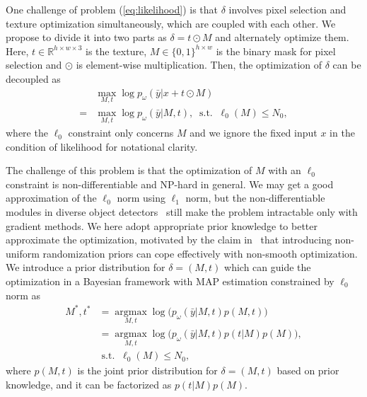 \documentclass[times,twocolumn,final,authoryear]{elsarticle}
\begin{document}
One challenge of problem (\ref{eq:likelihood}) is that $\delta$ involves pixel selection and texture optimization simultaneously, which are coupled with each other. We propose to divide it into two parts as $\delta=t\odot M$ and alternately optimize them. Here, $t\in\mathbb{R}^{h\times w\times 3}$ is the texture, $M\in \{0,1\}^{h\times w}$ is the binary mask for pixel selection and $\odot$ is element-wise multiplication. Then, the optimization of $\delta$ can be decoupled as
\begin{equation}
\begin{split}
    &\max_{M,t}\log p_\omega(\bar{y}|x+t\odot M)\\
    =&\max_{M,t}\log p_\omega(\bar{y}|M,t),\;\operatorname{ s.t. }\;\ell_0(M)\leq N_0,
\end{split}
\label{eq:reform}
\end{equation}
where the $\ell_0$ constraint only concerns $M$ and we ignore the fixed input $x$ in the condition of likelihood for notational clarity.

The challenge of this problem is that the optimization of $M$ with an $\ell_0$ constraint is non-differentiable and NP-hard in general. We may get a good approximation of the $\ell_0$ norm using $\ell_1$ norm, but the non-differentiable modules in diverse object detectors~\citep{girshick2014rich} still make the problem intractable only with gradient methods. We here adopt appropriate prior knowledge to better approximate the optimization, motivated by the claim in~\citep{a13010008randomize} that introducing non-uniform randomization priors can cope effectively with non-smooth optimization. We introduce a prior distribution for $\delta = (M,t)$ which can guide the optimization in a Bayesian framework with MAP estimation constrained by $\ell_0$ norm as 
\begin{equation}
\begin{split}
    M^*,t^*&=\mathop{\arg\max}\limits_{M,t} \log\big( p_\omega(\bar{y}|M,t)p(M,t)\big)\\
    &=\mathop{\arg\max}\limits_{M,t} \log\big(p_\omega(\bar{y}|M,t) p(t|M)p(M)\big),\\
    &\operatorname{ s.t. }\;\ell_0(M)\leq N_0,
\end{split}
\label{eq:bayesian}
\end{equation}
where $p(M,t)$ is the joint prior distribution for $\delta=(M,t)$ based on prior knowledge, and it can be factorized as $p(t|M)p(M)$. 
\end{document}
